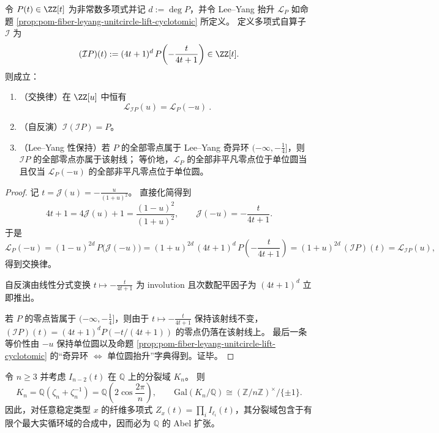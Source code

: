 \begin{theorem}\label{thm:pom-leyang-lift-mobius-involution-functorial}
令 \(P(t)\in\ZZ[t]\) 为非常数多项式并记 \(d:=\deg P\)，并令 Lee--Yang 抬升 \(\mathcal L_P\) 如命题 \ref{prop:pom-fiber-leyang-unitcircle-lift-cyclotomic} 所定义。
定义多项式自算子 \(\mathcal I\) 为
\[
(\mathcal I P)(t):=(4t+1)^d\,P\!\left(-\frac{t}{4t+1}\right)\in\ZZ[t].
\]
则成立：
\begin{enumerate}
  \item \textnormal{（交换律）}在 \(\ZZ[u]\) 中恒有
  \[
  \boxed{\ \mathcal L_{\mathcal I P}(u)=\mathcal L_P(-u)\ }.
  \]
  \item \textnormal{（自反演）}\(\mathcal I(\mathcal I P)=P\)。
  \item \textnormal{（Lee--Yang 性保持）}若 \(P\) 的全部零点属于 Lee--Yang 奇异环 \((-\infty,-\tfrac14]\)，则 \(\mathcal I P\) 的全部零点亦属于该射线；
  等价地，\(\mathcal L_P\) 的全部非平凡零点位于单位圆当且仅当 \(\mathcal L_P(-u)\) 的全部非平凡零点位于单位圆。
\end{enumerate}
\end{theorem}

\begin{proof}
记 \(t=\mathcal J(u)=-\frac{u}{(1+u)^2}\)。
直接化简得到
\[
4t+1=4\mathcal J(u)+1=\frac{(1-u)^2}{(1+u)^2},
\qquad
\mathcal J(-u)=-\frac{t}{4t+1}.
\]
于是
\[
\mathcal L_P(-u)
=(1-u)^{2d}\,P\!\bigl(\mathcal J(-u)\bigr)
=(1+u)^{2d}\,(4t+1)^d\,P\!\left(-\frac{t}{4t+1}\right)
=(1+u)^{2d}\,(\mathcal I P)(t)
=\mathcal L_{\mathcal I P}(u),
\]
得到交换律。
\par
自反演由线性分式变换 \(t\mapsto -\frac{t}{4t+1}\) 为 involution 且次数配平因子为 \((4t+1)^d\) 立即推出。
\par
若 \(P\) 的零点皆属于 \((-\infty,-\tfrac14]\)，则由于 \(t\mapsto -\frac{t}{4t+1}\) 保持该射线不变，\((\mathcal I P)(t)=(4t+1)^dP(-t/(4t+1))\) 的零点仍落在该射线上。
最后一条等价性由 \(-u\) 保持单位圆以及命题 \ref{prop:pom-fiber-leyang-unitcircle-lift-cyclotomic} 的“奇异环 \(\Leftrightarrow\) 单位圆抬升”字典得到。证毕。
\end{proof}

\begin{theorem}[路径分量零点的分裂域为最大实循环域]\label{thm:pom-path-indset-splitting-field-real-cyclotomic}
令 \(n\ge 3\) 并考虑 \(I_{n-2}(t)\) 在 \(\mathbb Q\) 上的分裂域 \(K_n\)。
则
\[
K_n=\mathbb Q(\zeta_n+\zeta_n^{-1})=\mathbb Q\!\left(2\cos\frac{2\pi}{n}\right),
\qquad
\mathrm{Gal}(K_n/\mathbb Q)\cong (\mathbb Z/n\mathbb Z)^\times/\{\pm 1\}.
\]
因此，对任意稳定类型 \(x\) 的纤维多项式 \(Z_x(t)=\prod_i I_{\ell_i}(t)\)，其分裂域包含于有限个最大实循环域的合成中，因而必为 \(\mathbb Q\) 的 Abel 扩张。
\end{theorem}

